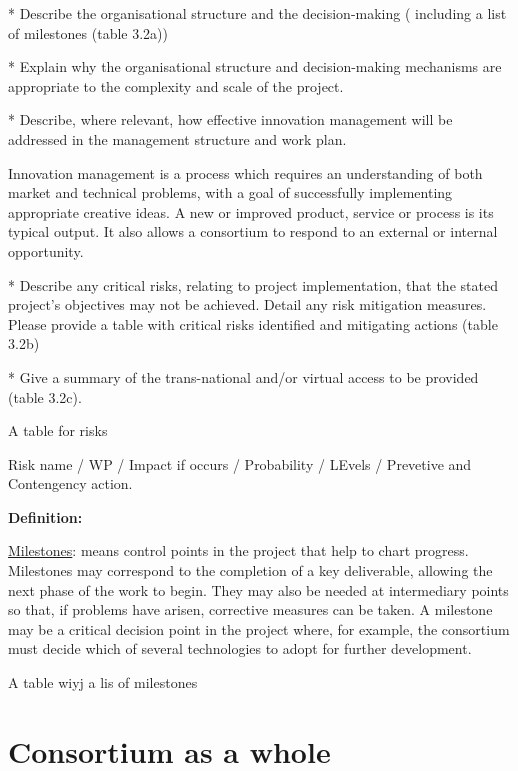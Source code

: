 \begin{todo}{}\color{red}
  * Describe the organisational structure and the decision-making ( including a list of milestones (table 3.2a))

  * Explain why the organisational structure and decision-making mechanisms are appropriate to the complexity and scale of the project.

  * Describe, where relevant, how effective innovation management will be addressed in the management structure and work plan.

  Innovation management is a process which requires an understanding of both market and technical problems, with a goal of successfully implementing appropriate creative ideas. A new or improved product, service or process is its typical output. It also allows a consortium to respond to an external or internal opportunity.

  * Describe any critical risks, relating to project implementation, that the stated project's objectives may not be achieved. Detail any risk mitigation measures. Please provide a table with critical risks identified and mitigating actions (table 3.2b)

  * Give a summary of the trans-national and/or virtual access to be provided (table 3.2c).


  {\color{red} A table for risks}

    Risk name / WP / Impact if occurs / Probability / LEvels / Prevetive and
    Contengency action.

    

  
  {\bf Definition:}
  
  \underline{Milestones}: means control points in the project that help to chart progress. Milestones may correspond to the completion of a key deliverable, allowing the next phase of the work to begin. They may also be needed at intermediary points so that, if problems have arisen, corrective measures can be taken. A milestone may be a critical decision point in the project where, for example, the consortium must decide which of several technologies to adopt for further development.
\end{todo}


{\color{red} A table wiyj a lis of milestones}



\section{Consortium as a whole}\label{sec:consortium}


